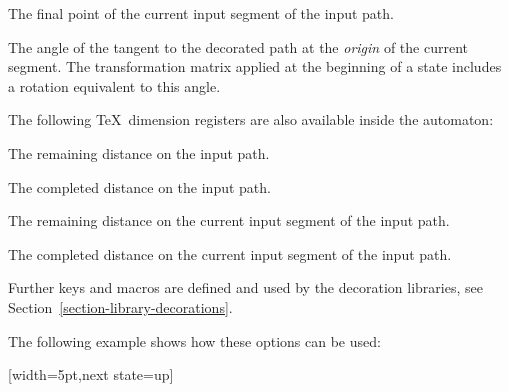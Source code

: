 \begin{command}{\pgfdeclaredecoration{}}
\begin{command}{\state{}}
        \begin{command}{\pgfpointdecoratedinputsegmentlast}
            The final point of the current input segment of the input path.
        \end{command}

        \begin{command}{\pgfdecoratedangle}
            The angle of the tangent to the decorated path at the \emph{origin}
            of the current segment. The transformation matrix applied at the
            beginning of a state includes a rotation equivalent to this angle.
        \end{command}

        The following \TeX\ dimension registers are also available inside the
        automaton:

        \begin{command}{\pgfdecoratedremainingdistance}
            The remaining distance on the input path.
        \end{command}

        \begin{command}{\pgfdecoratedcompleteddistance}
            The completed distance on the input path.
        \end{command}

        \begin{command}{\pgfdecoratedinputsegmentremainingdistance}
            The remaining distance on the current input segment of the input path.
        \end{command}

        \begin{command}{\pgfdecoratedinputsegmentcompleteddistance}
            The completed distance on the current input segment of the input path.
        \end{command}

        Further keys and macros are defined and used by the decoration
        libraries, see Section~\ref{section-library-decorations}.

        The following example shows how these options can be used:
\begin{codeexample}[preamble={\usetikzlibrary{decorations}}]
{
  [width=5pt,next state=up]
  { \pgfpathlineto{\pgfpoint{5pt}{0pt}} }

}
\end{codeexample}
\end{command}
\end{command}
